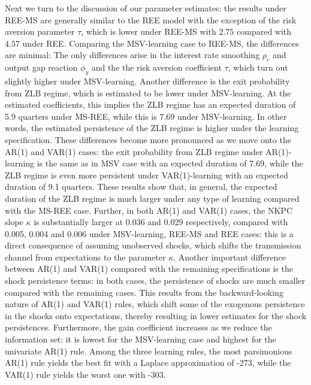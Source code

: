 \documentclass[12pt,reqno]{article}
\numberwithin{equation}{section}
\begin{document}
\noindent
Next we turn to the discussion of our parameter estimates: the results under REE-MS are generally similar to the REE model with the exception of the risk aversion parameter $\tau$, which is lower under REE-MS with $2.75 $ compared with $4.57 $ under REE. Comparing the MSV-learning case to REE-MS, the differences are minimal: The only differences arise in the interest rate smoothing $\rho_r$ and output gap reaction $\phi_y$ and the the risk aversion  coefficient $\tau$, which turn out slightly higher under MSV-learning. Another difference is the exit probability from ZLB regime, which is estimated to be lower under MSV-learning. At the estimated coefficients, this implies the ZLB regime has an expected duration of  5.9 quarters under MS-REE, while this is 7.69 under MSV-learning. In other words, the estimated persistence of the ZLB regime is higher under the learning specification. These differences become more pronounced as we move onto the AR(1) and VAR(1) cases: the exit probability from ZLB regime under AR(1)-learning is the same as in MSV case with an expected duration of 7.69, while the ZLB regime is even more persistent under VAR(1)-learning with an expected duration of 9.1 quarters. These results show that, in general, the expected duration of the ZLB regime is much larger under any type of learning compared with the MS-REE case. Further, in both AR(1) and VAR(1) cases, the NKPC slope $\kappa$ is substantially larger at 0.036 and 0.029 respectively, compared with 0.005, 0.004 and 0.006 under MSV-learning, REE-MS and REE cases: this is a direct consequence of assuming unobserved shocks, which shifts the transmission channel from expectations to the parameter $\kappa$. Another important difference between AR(1) and VAR(1) compared with the remaining specifications is the shock persistence terms: in both cases, the persistence of shocks are much smaller compared with the remaining cases. This results from the backward-looking nature of AR(1) and VAR(1) rules, which shift some of the exogenous persistence in the shocks onto expectations, thereby resulting in lower estimates for the shock persistences. Furthermore, the gain coefficient increases as we reduce the information set: it is lowest for the MSV-learning case and highest for the univariate AR(1) rule. Among the three learning rules, the most parsimonious AR(1) rule yields the best fit with a Laplace approximation of -273, while the VAR(1) rule yields the worst one with -303. \\
\end{document}
